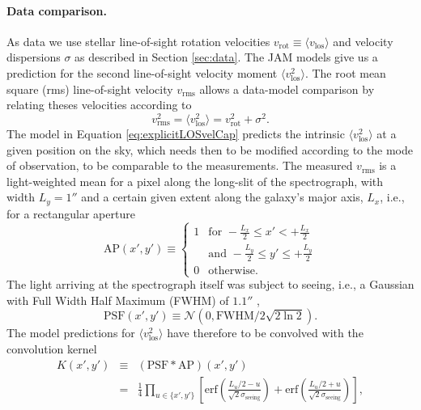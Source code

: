 \paragraph{Data comparison.} As data we use stellar line-of-sight rotation velocities $v_\text{rot} \equiv \langle v_\text{los} \rangle$ and velocity dispersions $\sigma$ as described in Section \ref{sec:data}. The JAM models give us a prediction for the second line-of-sight velocity moment $\langle v_\text{los}^2 \rangle$. The root mean square (rms) line-of-sight velocity $v_\text{rms}$ allows a data-model comparison by relating theses velocities according to 
\begin{equation*}
v_\text{rms}^2 = \langle v_\text{los}^2 \rangle = v_\text{rot}^2 + \sigma^2.
\end{equation*}
The model in Equation \eqref{eq:explicitLOSvelCap} predicts the intrinsic $\langle v_\text{los}^2 \rangle$ at a given position on the sky, which needs then to be modified according to the mode of observation, to be comparable to the measurements. The measured $v_\text{rms}$ is a light-weighted mean for a pixel along the long-slit of the spectrograph, with width $L_y = 1''$ \citep{SWELLSV} and a certain given extent along the galaxy's major axis, $L_x$, i.e., for a rectangular aperture
\begin{equation*}
\text{AP}(x',y') \equiv \left\{ \begin{array}{ll} 1 & \text{for } -\frac{L_x}{2} \leq x' < + \frac{L_x}{2}\\
& \text{and } - \frac{L_y}{2} \leq y' \leq + \frac{L_y}{2}  \\ 0 & \text{otherwise.} \end{array} \right.
\end{equation*}
The light arriving at the spectrograph itself was subject to seeing, i.e., a Gaussian with Full Width Half Maximum (FWHM) of $1.1''$ \citep{SWELLSV},
\begin{equation*}
\text{PSF}(x',y')\equiv\mathscr{N}(0,\text{FWHM}/2\sqrt{2\ln2}).
\end{equation*}
The model predictions for $\langle v_\text{los}^2 \rangle$ have therefore to be convolved with the convolution kernel
\begin{eqnarray*}
K(x',y') &\equiv& (\text{PSF} \ast \text{AP})(x',y') \\
&=& \frac{1}{4} \prod_{u \in \{x',y'\}} \left[ \text{erf}\left( \frac{L_u/2 - u}{\sqrt{2}\sigma_\text{seeing}}\right) + \text{erf} \left( \frac{L_u/2 + u}{\sqrt{2} \sigma_\text{seeing}} \right) \right],
\end{eqnarray*}
